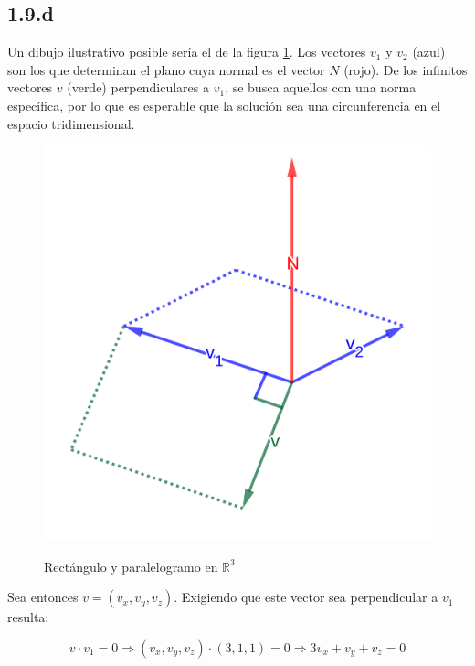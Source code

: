\documentclass{article}
\renewcommand{\Bbb}{\mathbb}
\begin{document}
\subsection*{1.9.d}
\label{subsec:1.9.d}

Un dibujo ilustrativo posible sería el de la figura \ref{fig:1-9-d}. Los vectores $v_1$ y $v_2$ (azul) son los que determinan el plano cuya normal es el vector $N$ (rojo). De los infinitos vectores $v$ (verde) perpendiculares a $v_1$, se busca aquellos con una norma específica, por lo que es esperable que la solución sea una circunferencia en el espacio tridimensional. 

\begin{figure}[ht]
\caption{Rectángulo y paralelogramo en $\Bbb R^3$}
\includegraphics[scale=1]{../img/exercises/guide_01/09_d.png} 
\centering
\label{fig:1-9-d}
\end{figure}

Sea entonces $v = (v_x, v_y, v_z)$. Exigiendo que este vector sea perpendicular a $v_1$ resulta:

\begin{equation}
v \cdot v_1 = 0 \Rightarrow (v_x, v_y, v_z) \cdot (3, 1, 1) = 0 \Rightarrow 3 v_x + v_y + v_z = 0
\end{equation}
\end{document}
